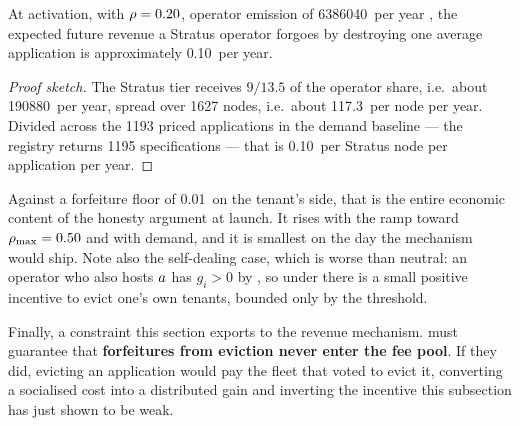 \begin{proposition}
\label{prop:23:launch}
At \PNR{} activation, with $\rho = 0.20$, operator emission of \num{6386040}\flux\ per year
, the expected future
revenue a Stratus operator forgoes by destroying one average application is approximately
\num{0.10}\flux\ per year.
\end{proposition}

\begin{proof}[Proof sketch]
 The Stratus
tier receives $9/13.5$ of the operator share, i.e.\ about \num{190880}\flux\ per year, spread over
\num{1627} nodes, i.e.\ about \num{117.3}\flux\ per node per year. Divided across the \num{1193} priced
applications in the \PNR{} demand baseline  — the registry returns
\num{1195} specifications
 — that is
\num{0.10}\flux\ per Stratus node per application per year.
\end{proof}

Against a forfeiture floor of \num{0.01}\flux\ on the tenant's side, that is the entire economic
content of the honesty argument at launch. It rises with the ramp toward $\rho_{\max} = 0.50$ and
with demand, and it is smallest on the day the mechanism would ship. Note also the self-dealing
case, which is worse than neutral: an operator who also hosts $a$ has $g_i > 0$ by
, so under \PNR{} there is a small positive incentive to evict one's own
tenants, bounded only by the threshold.

Finally, a constraint this section exports to the revenue mechanism.  must
guarantee that \textbf{forfeitures from eviction never enter the fee pool}. If they did, evicting an
application would pay the fleet that voted to evict it, converting a socialised cost into a
distributed gain and inverting the incentive this subsection has just shown to be weak.

